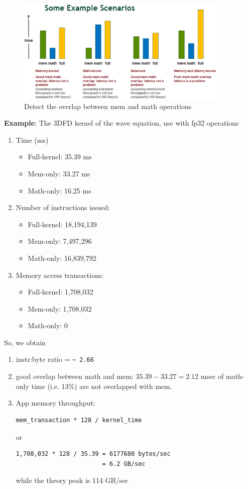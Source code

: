 \begin{figure}[hbt]
  \centerline{\includegraphics[height=5cm,
    angle=0]{./images/mem_math_bound.eps}}
\caption{Detect the overlap between mem and math operations}
\label{fig:mem_math_bound}
\end{figure}

{\bf Example}: The 3DFD kernel of the wave equation, use with fp32
operations 
\begin{enumerate}
\item Time (ms) 
  \begin{itemize}
  \item Full-kernel: 35.39 ms
  \item Mem-only: 33.27 ms
  \item Math-only: 16.25 ms
  \end{itemize}

\item Number of instructions issued:
  \begin{itemize}
  \item Full-kernel: 18,194,139
  \item Mem-only: 7,497,296
  \item Math-only: 16,839,792
  \end{itemize}

\item Memory access transactions:
  \begin{itemize}
  \item Full-kernel: 1,708,032
  \item Mem-only: 1,708,032
  \item Math-only: 0
  \end{itemize}
\end{enumerate}

So, we obtain
\begin{enumerate}
\item instr:byte ratio = \verb!~ 2.66!

\item good overlap between math and mem: $35.39-33.27 = 2.12$ msec of
  math-only time (i.e. 13\%) are not overlapped with mem. 

\item App memory throughput:
\begin{verbatim}
mem_transaction * 128 / kernel_time
\end{verbatim}
or 
\begin{verbatim}
1,708,032 * 128 / 35.39 = 6177680 bytes/sec
                        = 6.2 GB/sec
\end{verbatim}
while the theory peak is 114 GB/sec
\end{enumerate}

